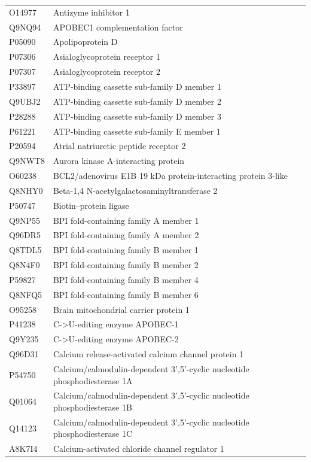 \documentclass[10pt,twoside]{article}
\begin{document}
\begin{longtable}{lL{0.75\textwidth}}
O14977	&	Antizyme inhibitor 1 	\\
Q9NQ94	&	APOBEC1 complementation factor 	\\
P05090	&	Apolipoprotein D 	\\
P07306	&	Asialoglycoprotein receptor 1 	\\
P07307	&	Asialoglycoprotein receptor 2 	\\
P33897	&	ATP-binding cassette sub-family D member 1 	\\
Q9UBJ2	&	ATP-binding cassette sub-family D member 2 	\\
P28288	&	ATP-binding cassette sub-family D member 3 	\\
P61221	&	ATP-binding cassette sub-family E member 1 	\\
P20594	&	Atrial natriuretic peptide receptor 2 	\\
Q9NWT8	&	Aurora kinase A-interacting protein 	\\
O60238	&	BCL2/adenovirus E1B 19 kDa protein-interacting protein 3-like 	\\
Q8NHY0	&	Beta-1,4 N-acetylgalactosaminyltransferase 2 	\\
P50747	&	Biotin--protein ligase 	\\
Q9NP55	&	BPI fold-containing family A member 1 	\\
Q96DR5	&	BPI fold-containing family A member 2 	\\
Q8TDL5	&	BPI fold-containing family B member 1 	\\
Q8N4F0	&	BPI fold-containing family B member 2 	\\
P59827	&	BPI fold-containing family B member 4 	\\
Q8NFQ5	&	BPI fold-containing family B member 6 	\\
O95258	&	Brain mitochondrial carrier protein 1 	\\
P41238	&	C->U-editing enzyme APOBEC-1 	\\
Q9Y235	&	C->U-editing enzyme APOBEC-2 	\\
Q96D31	&	Calcium release-activated calcium channel protein 1 	\\
P54750	&	Calcium/calmodulin-dependent 3',5'-cyclic nucleotide phosphodiesterase 1A 	\\
Q01064	&	Calcium/calmodulin-dependent 3',5'-cyclic nucleotide phosphodiesterase 1B 	\\
Q14123	&	Calcium/calmodulin-dependent 3',5'-cyclic nucleotide phosphodiesterase 1C 	\\
A8K7I4	&	Calcium-activated chloride channel regulator 1 	\\

\end{longtable}
\end{document}
